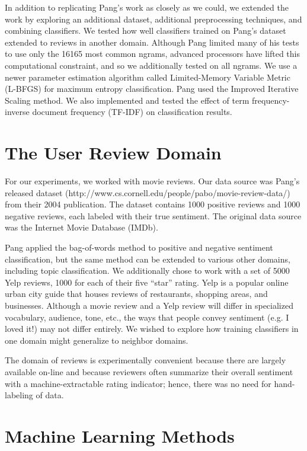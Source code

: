 \documentclass[10pt,twocolumn,letterpaper]{article}
\begin{document}
In addition to replicating Pang’s work as closely as we could, we extended the work by exploring an additional dataset, additional preprocessing techniques, and combining classifiers. We tested how well classifiers trained on Pang’s dataset extended to reviews in another domain. Although Pang limited many of his tests to use only the 16165 most common ngrams, advanced processors have lifted this computational constraint, and so we additionally tested on all ngrams. We use a newer parameter estimation algorithm called Limited-Memory Variable Metric (L-BFGS) for maximum entropy classification. Pang used the Improved Iterative Scaling method. We also implemented and tested the effect of term frequency-inverse document frequency (TF-IDF) on classification results.

\section{The User Review Domain}
For our experiments, we worked with movie reviews. Our data source was Pang’s released dataset (http://www.cs.cornell.edu/people/pabo/movie-review-data/) from their 2004 publication. The dataset contains 1000 positive reviews and 1000 negative reviews, each labeled with their true sentiment. The original data source was the Internet Movie Database (IMDb).

Pang applied the bag-of-words method to positive and negative sentiment classification, but the same method can be extended to various other domains, including topic classification. We additionally chose to work with a set of 5000 Yelp reviews, 1000 for each of their five “star” rating. Yelp is a popular online urban city guide that houses reviews of restaurants, shopping areas, and businesses. Although a movie review and a Yelp review will differ in specialized vocabulary, audience, tone, etc., the ways that people convey sentiment (e.g. I loved it!) may not differ entirely. We wished to explore how training classifiers in one domain might generalize to neighbor domains.

The domain of reviews is experimentally convenient because there are largely available on-line and because reviewers often summarize their overall sentiment with a machine-extractable rating indicator; hence, there was no need for hand-labeling of data.


\section{Machine Learning Methods}
\end{document}
